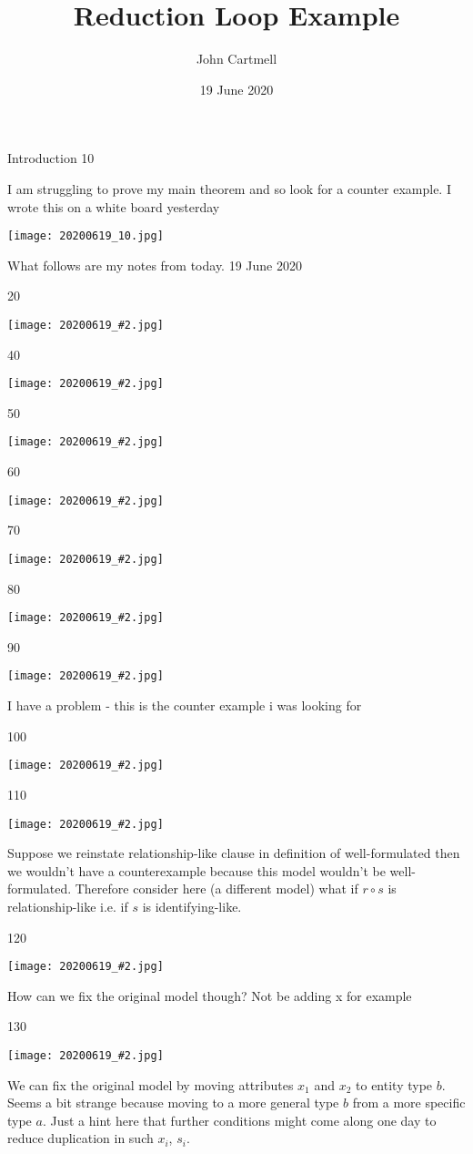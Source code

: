 \documentclass{beamer}   %
\title{Reduction Loop Example}
\author{John Cartmell}
\institute{Ad Otium}
\date{19 June 2020}
\begin{document}
\begin{frame}
\titlepage
\end{frame}

\begin{frame}{Introduction 10}

I am struggling to prove my main theorem and so look for a counter example.
I wrote this on a white board yesterday
\begin{center}
\texttt{[image: 20200619\_10.jpg]}
\end{center}
What follows are my notes from today. 19 June 2020
\end{frame}

\newcommand{\slide}[2][]{\begin{frame}{#2}
\begin{center}
\texttt{[image: 20200619\_\#2.jpg]}
\end{center}
#1
\end{frame}}

\slide{20}
\slide{40}
\slide{50}
\slide{60}
\slide{70}
\slide{80}
\slide[I have a problem - this is the counter example i was looking for]{90}
\slide{100}
\slide[\footnotesize Suppose we reinstate relationship-like clause in definition of well-formulated then we wouldn't have a counterexample because
this model wouldn't be well-formulated. Therefore consider here (a different model) what if $r \circ s$ is relationship-like i.e. if $s$ is identifying-like.]{110}
\slide[How can we fix the original model though? Not be adding x for example]{120}
\slide[\footnotesize We can fix the original model by moving attributes $x_1$ and $x_2$ to entity type $b$. Seems a bit strange because moving to a more general type $b$ from a more specific type $a$.
Just a hint here that further conditions might come along one day to reduce duplication in such $x_i$, $s_i$.]
 {130}
\end{document}
